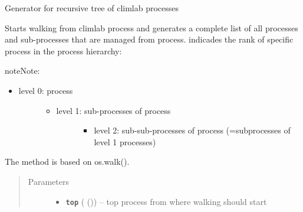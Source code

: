 \documentclass[a4paper,10pt,english]{sphinxmanual}
\begin{document}
\begin{fulllineitems}
\label{api/climlab.utils:climlab.utils.walk.walk_processes}
Generator for recursive tree of climlab processes

Starts walking from climlab process  and generates a complete 
list of all processes and sub-processes that are managed from  process.
 indicades the rank of specific process in the process hierarchy:

\begin{notice}{note}{Note:}\begin{itemize}
\item {} \begin{description}
\item[{level 0:  process}] \leavevmode\begin{itemize}
\item {} \begin{description}
\item[{level 1: sub-processes of  process}] \leavevmode\begin{itemize}
\item {} 
level 2: sub-sub-processes of  process (=subprocesses of level 1 processes)

\end{itemize}

\end{description}

\end{itemize}

\end{description}

\end{itemize}
\end{notice}

The method is based on os.walk().
\begin{quote}\begin{description}
\item[{Parameters}] \leavevmode\begin{itemize}
\item {} 
\textbf{\texttt{top}} ({\hyperref[api/climlab.process:climlab.process.process.Process]{\emph{}}} ()) -- top process from where walking should start


\end{itemize}
\end{description}
\end{quote}
\end{fulllineitems}
\end{document}
